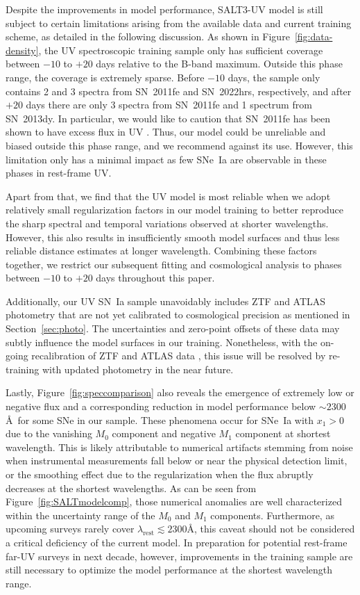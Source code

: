 \documentclass[twocolumn,tighten,times,floatfix]{aastex631}
\begin{document}
Despite the improvements in model performance, SALT3-UV model is still subject to certain limitations arising from the available data and current training scheme, as detailed in the following discussion.
As shown in Figure~\ref{fig:data-density}, the UV spectroscopic training sample only has sufficient coverage between $-10$ to $+20$ days relative to the B-band maximum. Outside this phase range, the coverage is extremely sparse. Before $-10$ days, the sample only contains 2 and 3 spectra from SN~2011fe and SN~2022hrs, respectively, and after $+20$ days there are only 3 spectra from SN~2011fe and 1 spectrum from SN~2013dy. In particular, we would like to caution that SN~2011fe has been shown to have excess flux in UV \citep{foley16}. 
Thus, our model could be unreliable and biased outside this phase range, and we recommend against its use. 
However, this limitation only has a minimal impact as few SNe~Ia are observable in these phases in rest-frame UV. 


Apart from that, we find that the UV model is most reliable when we adopt relatively small regularization factors in our model training to better reproduce the sharp spectral and temporal variations observed at shorter wavelengths. However, this also results in insufficiently smooth model surfaces and thus less reliable distance estimates at longer wavelength.
Combining these factors together, we restrict our subsequent fitting and cosmological analysis to phases between $-10$ to $+20$ days throughout this paper.


Additionally, our UV SN~Ia sample unavoidably includes ZTF and ATLAS photometry that are not yet calibrated to cosmological precision as mentioned in Section~\ref{sec:photo}. The uncertainties and zero-point offsets of these data may subtly influence the model surfaces in our training. Nonetheless, with the on-going recalibration of ZTF and ATLAS data \citep{Lacroix25,Marlin25}, this issue will be resolved by re-training with updated photometry in the near future.

Lastly, Figure~\ref{fig:speccomparison} also reveals the emergence of extremely low or negative flux and a corresponding reduction in model performance below $\sim 2300$\AA\ for some SNe in our sample. These phenomena occur for SNe~Ia with $x_1 >0$ due to the vanishing $M_0$ component and negative $M_1$ component at shortest wavelength. This is likely attributable to numerical artifacts stemming from noise when instrumental measurements fall below or near the physical detection limit, or the smoothing effect due to the regularization when the flux abruptly decreases at the shortest wavelengths. As can be seen from Figure~\ref{fig:SALTmodelcomp}, those numerical anomalies are well characterized within the uncertainty range of the $M_0$ and $M_1$ components. Furthermore, as upcoming surveys rarely cover $\lambda_\textrm{rest}\lesssim2300$\AA, this caveat should not be considered a critical deficiency of the current model. In preparation for potential rest-frame far-UV surveys in next decade, however, improvements in the training sample are still necessary to optimize the model performance at the shortest wavelength range.
\end{document}
